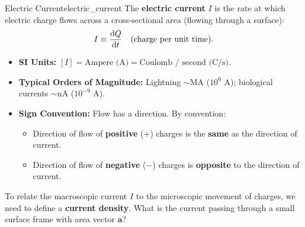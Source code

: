 \begin{definition}{Electric Current}{electric_current}
The \textbf{electric current} $I$ is the rate at which electric charge flows across a cross-sectional area (flowing through a surface):
\begin{equation}
    I \equiv \dv{Q}{t} \quad \text{(charge per unit time)}.
\end{equation}
\begin{itemize}
    \item \textbf{SI Units:} $[I] = \text{Ampere (A)} = \text{Coulomb / second (C/s)}$.
    \item \textbf{Typical Orders of Magnitude:} Lightning $\sim \text{MA}$ ($10^6\text{ A}$); biological currents $\sim \text{nA}$ ($10^{-9}\text{ A}$).
    \item \textbf{Sign Convention:} Flow has a direction. By convention:
    \begin{itemize}
        \item Direction of flow of \textbf{positive} ($+$) charges is the \textbf{same} as the direction of current.
        \item Direction of flow of \textbf{negative} ($-$) charges is \textbf{opposite} to the direction of current.
    \end{itemize}
\end{itemize}
\end{definition}

To relate the macroscopic current $I$ to the microscopic movement of charges, we need to define a \textbf{current density}. What is the current passing through a small surface frame with area vector $\bm{a}$?

